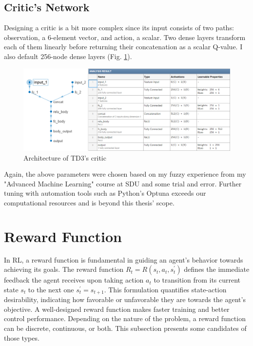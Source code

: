 \documentclass[../main.tex]{subfiles}
\begin{document}
\subsection{Critic's Network}
Designing a critic is a bit more complex since its input consists of two paths: observation, a 6-element vector, and action, a scalar. Two dense layers transform each of them linearly before returning their concatenation as a scalar Q-value. I also default 256-node dense layers (Fig. \ref{fig:critic}).
\begin{figure}[htbp]
    \centering
    \includegraphics[width=1\linewidth]{figures/critic_network.png}
    \caption{Architecture of TD3's critic}
    \label{fig:critic}
\end{figure}

Again, the above parameters were chosen based on my fuzzy experience from my "Advanced Machine Learning" course at SDU and some trial and error. Further tuning with automation tools such as Python's Optuna exceeds our computational resources and is beyond this thesis' scope.


\section{Reward Function} \label{sec:rwdfcn}
In RL, a reward function is fundamental in guiding an agent's behavior towards achieving its goals. The reward function $R_t = R(s_t,a_t,s^{\prime}_t)$ defines the immediate feedback the agent receives upon taking action $a_t$ to transition from its current state $s_t$ to the next one $s^{\prime}_t = s_{t+1}$. This formulation quantifies state-action desirability, indicating how favorable or unfavorable they are towards the agent's objective. A well-designed reward function makes faster training and better control performance. Depending on the nature of the problem, a reward function can be discrete, continuous, or both. This subsection presents some candidates of those types.
\end{document}
